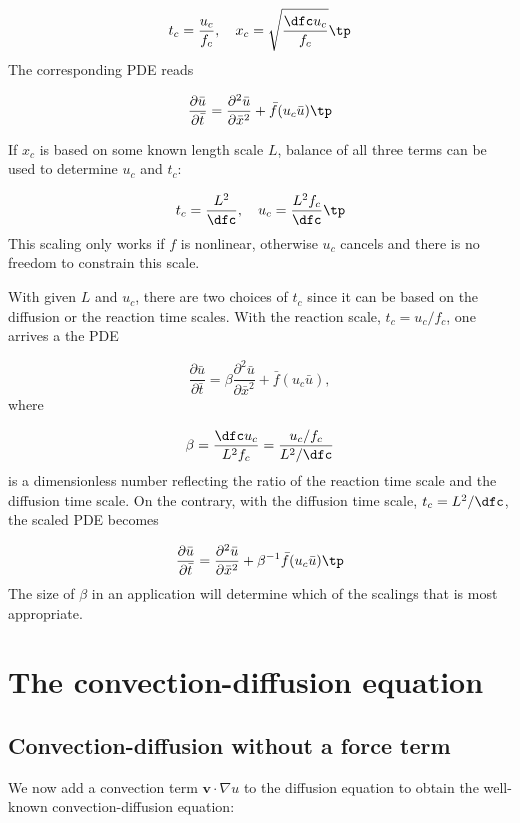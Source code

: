 \documentclass[graybox,envcountchap,sectrefs,final]{svmonodo}
\begin{document}
\[ t_c = \frac{u_c}{f_c},\quad x_c = \sqrt{\frac{\dfc u_c}{f_c}}\tp\]
The corresponding PDE reads

\begin{equation}
\frac{\partial\bar u}{\partial\bar t} =
\frac{\partial^2\bar u}{\partial\bar x^2} + \bar f(u_c\bar u)\tp
\end{equation}

If $x_c$ is based on some known length scale $L$, balance of all three
terms can be used to determine $u_c$ and $t_c$:

\[ t_c = \frac{L^2}{\dfc},\quad u_c = \frac{L^2 f_c}{\dfc}\tp\]
This scaling only works if $f$ is nonlinear, otherwise $u_c$ cancels
and there is no freedom to constrain this scale.

With given $L$ and $u_c$, there are two choices of $t_c$ since it can
be based on the diffusion or the reaction time scales. With
the reaction scale, $t_c = u_c/f_c$, one arrives a the PDE

\begin{equation}
\frac{\partial\bar u}{\partial\bar t} =
\beta\frac{\partial^2\bar u}{\partial\bar x^2} + \bar f(u_c\bar u),
\end{equation}
where

\[ \beta = \frac{\dfc u_c}{L^2 f_c} = \frac{u_c/f_c}{L^2/\dfc}\]
is a dimensionless number reflecting the ratio of the reaction time
scale and the diffusion time scale. On the contrary,
with the
diffusion time scale, $t_c=L^2/\dfc$, the scaled PDE becomes

\begin{equation}
\frac{\partial\bar u}{\partial\bar t} =
\frac{\partial^2\bar u}{\partial \bar x^2} + \beta^{-1}\bar f(u_c\bar u)\tp
\end{equation}
The size of $\beta$ in an application will determine which of the scalings
that is most appropriate.


\section{The convection-diffusion equation}
\label{scale:convdiff}

\subsection{Convection-diffusion without a force term}


We now add a convection term $\bm{v}\cdot\nabla u$ to the diffusion
equation to obtain the well-known convection-diffusion equation:
\end{document}
